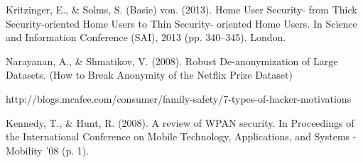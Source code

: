 \documentclass[10pt,journal,compsoc]{IEEEtran}
\begin{document}
\begin{thebibliography}{1}
Kritzinger, E., \& Solms, S. (Basie) von. (2013). Home User Security- from Thick Security-oriented Home Users to Thin Security- oriented Home Users. In Science and Information Conference (SAI), 2013 (pp. 340–345). London.

Narayanan, A., \& Shmatikov, V. (2008). Robust De-anonymization of Large Datasets. (How to Break Anonymity of the Netflix Prize Dataset)

http://blogs.mcafee.com/consumer/family-safety/7-types-of-hacker-motivations

Kennedy, T., \& Hunt, R. (2008). A review of WPAN security. In Proceedings of the International Conference on Mobile Technology, Applications, and Systems - Mobility ’08 (p. 1).
\end{thebibliography}



\end{document}
